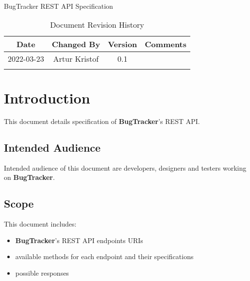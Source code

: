 \documentclass[a4paper]{article}
\newcommand{\appName}{BugTracker}
\newcommand{\appNameBold}{\textbf{BugTracker}}
\begin{document}
    \begin{titlepage}
        \vspace*{\fill}
        \begin{center}
            \huge
            \appName{}
            \vspace{0.4cm}
            \Huge
            REST API Specification
            \vspace{3cm}
            \begin{table}[h]
                \centering
                \caption{Document Revision History}
                \begin{tabular}{cccc}
                    \hline
                    Date       & Changed By    & Version & Comments \\
                    \hline
                    2022-03-23 & Artur Kristof & 0.1     & \hfill   \\
                    \hfill     & \hfill        & \hfill  & \hfill   \\
                    \hline
                \end{tabular}
            \end{table}
        \end{center}
        \vspace*{\fill}
    \end{titlepage}



    \tableofcontents




    \pagebreak
    \section{Introduction}
    This document details specification of \appNameBold{}'s REST API.

    \subsection{Intended Audience}
    Intended audience of this document are developers, designers and testers working on \appNameBold{}.

    \subsection{Scope}
    This document includes:
    \begin{itemize}
        \item \appNameBold{}'s REST API endpoints URIs
        \item available methods for each endpoint and their specifications
        \item possible responses
    \end{itemize}
\end{document}
